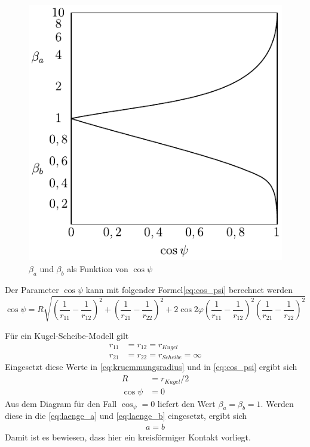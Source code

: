 \begin{figure}[htb]
    \centering
    \includegraphics[]{./images/beta_cos_psi_diagram.pdf}
    \caption{$\beta_a$ und $\beta_b$ als Funktion von $\cos{\psi}$\cite{wisniewski}}
    \label{fig:beta_a_und_beta_b_als_funktion_der_cos_psi}
\end{figure}
%

Der Parameter $\cos{\psi}$ kann mit folgender Formel\ref{eq:cos_psi} berechnet werden
\begin{equation}
    \label{eq:cos_psi}
    \cos{\psi} = R  \sqrt{\left( \frac{1}{r_{11}} - \frac{1}{r_{12}} \right)^2 
                                + \left( \frac{1}{r_{21}} - \frac{1}{r_{22}} \right)^2 
                                + 2  \cos{2 \varphi} 
                                 \left( \frac{1}{r_{11}} - \frac{1}{r_{12}}  \right)^2 
                                 \left( \frac{1}{r_{21}} - \frac{1}{r_{22}} \right)^2}
\end{equation}
%

Für ein Kugel-Scheibe-Modell gilt
%
\begin{align*}
    r_{11} &= r_{12} = r_{Kugel} \\
    r_{21} &= r_{22} = r_{Scheibe} = \infty
\end{align*}
%
Eingesetzt diese Werte in \ref{eq:kruemmungsradius} und in \ref{eq:cos_psi} ergibt sich 
%
\begin{align*}
    R &= r_{Kugel}/2 \\
    \cos{\psi} &= 0
\end{align*}
%
Aus dem Diagram für den Fall $\cos_{\psi} = 0$ liefert den Wert $\beta_a = \beta_b = 1$.
Werden diese in die \ref{eq:laenge_a} und \ref{eq:laenge_b} eingesetzt, ergibt sich
%
\begin{align*}
    a = b
\end{align*}
%
Damit ist es bewiesen, dass hier ein kreisförmiger Kontakt vorliegt.

